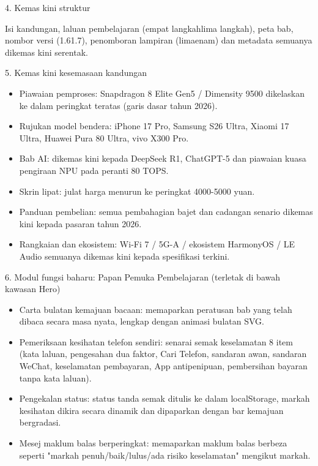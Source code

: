 4. Kemas kini struktur

Isi kandungan, laluan pembelajaran (empat langkahlima langkah), peta bab, nombor versi (1.61.7), penomboran lampiran (limaenam) dan metadata semuanya dikemas kini serentak.

5. Kemas kini kesemasaan kandungan

\begin{itemize}
  \item Piawaian pemproses: Snapdragon 8 Elite Gen5 / Dimensity 9500 dikelaskan ke dalam peringkat teratas (garis dasar tahun 2026).
  \item Rujukan model bendera: iPhone 17 Pro, Samsung S26 Ultra, Xiaomi 17 Ultra, Huawei Pura 80 Ultra, vivo X300 Pro.
  \item Bab AI: dikemas kini kepada DeepSeek R1, ChatGPT-5 dan piawaian kuasa pengiraan NPU pada peranti 80 TOPS.
  \item Skrin lipat: julat harga menurun ke peringkat 4000-5000 yuan.
  \item Panduan pembelian: semua pembahagian bajet dan cadangan senario dikemas kini kepada pasaran tahun 2026.
  \item Rangkaian dan ekosistem: Wi-Fi 7 / 5G-A / ekosistem HarmonyOS / LE Audio semuanya dikemas kini kepada spesifikasi terkini.
\end{itemize}

6. Modul fungsi baharu: Papan Pemuka Pembelajaran (terletak di bawah kawasan Hero)

\begin{itemize}
  \item Carta bulatan kemajuan bacaan: memaparkan peratusan bab yang telah dibaca secara masa nyata, lengkap dengan animasi bulatan SVG.
  \item Pemeriksaan kesihatan telefon sendiri: senarai semak keselamatan 8 item (kata laluan, pengesahan dua faktor, Cari Telefon, sandaran awan, sandaran WeChat, keselamatan pembayaran, App antipenipuan, pembersihan bayaran tanpa kata laluan).
  \item Pengekalan status: status tanda semak ditulis ke dalam localStorage, markah kesihatan dikira secara dinamik dan dipaparkan dengan bar kemajuan bergradasi.
  \item Mesej maklum balas berperingkat: memaparkan maklum balas berbeza seperti "markah penuh/baik/lulus/ada risiko keselamatan" mengikut markah.
\end{itemize}



